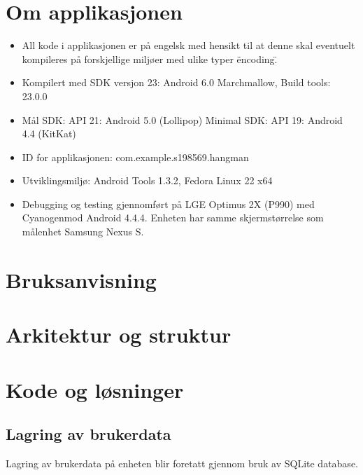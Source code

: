 \chapter{Om applikasjonen}


\begin{itemize}
\item All kode i applikasjonen er på engelsk med hensikt til at denne skal eventuelt kompileres på forskjellige miljøer med ulike typer \"encoding\". 
\item Kompilert med SDK versjon 23: Android 6.0 Marchmallow, Build tools: 23.0.0
\item Mål SDK: API 21: Android 5.0 (Lollipop) Minimal SDK: API 19: Android 4.4 (KitKat)
\item ID for applikasjonen: com.example.s198569.hangman
\item Utviklingsmiljø: Android Tools 1.3.2, Fedora Linux 22 x64
\item Debugging og testing gjennomført på LGE Optimus 2X (P990) med Cyanogenmod Android 4.4.4. Enheten har samme skjermstørrelse som målenhet Samsung Nexus S.
\end{itemize}

\chapter{Bruksanvisning}

\chapter{Arkitektur og struktur}

\chapter{Kode og løsninger}

\section{Lagring av brukerdata}
Lagring av brukerdata på enheten blir foretatt gjennom bruk av SQLite database. 